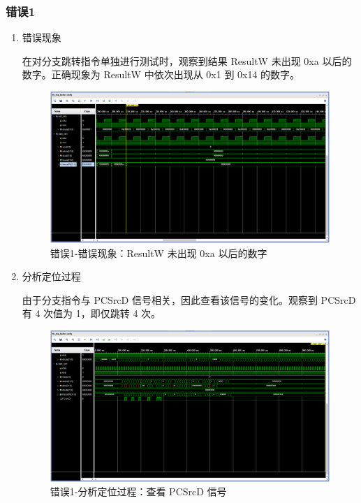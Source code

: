 \subsubsection{错误1}
\begin{enumerate}[(1)]
    \item 错误现象

在对分支跳转指令单独进行测试时，观察到结果 ResultW 未出现 0xa 以后的数字。正确现象为 ResultW 中依次出现从 0x1 到 0x14 的数字。

\begin{figure}[H]
    \centering
    \includegraphics[width=\textwidth]{image/错误1-错误现象1.png}
    \caption{错误1-错误现象：ResultW 未出现 0xa 以后的数字}
    \label{fig:错误1-错误现象1}
\end{figure}

    \item 分析定位过程

由于分支指令与 PCSrcD 信号相关，因此查看该信号的变化。观察到 PCSrcD 有 4 次值为 1，即仅跳转 4 次。

\begin{figure}[H]
    \centering
    \includegraphics[width=\textwidth]{image/错误1-分析定位过程1.png}
    \caption{错误1-分析定位过程：查看 PCSrcD 信号}
    \label{fig:错误1-分析定位过程1}
\end{figure}


\end{enumerate}
